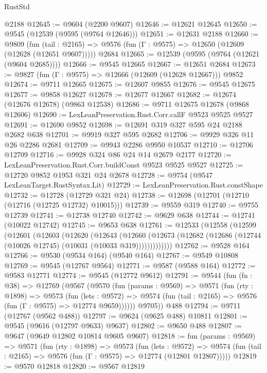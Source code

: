 \begin{lexlean}{RustStd}
\begin{coremodule}
    @2188
@12645 := @9604 (@2200 @9607)
@12646 := @12621 @12645
@12650 := @9545 (@12539 (@9595 (@9764 @12646)))
@12651 := @12631 @2188
@12660 := @9809
    (fun (tail : @2165) => @9576 (fun (Γ : @9575) => @12650 (@12609 (@12628 (@12651 @9607)))))
    @2684
@12665 := @12539 (@9595 (@9764 (@12621 (@9604 @2685))))
@12666 := @9545 @12665
@12667 := @12651 @2684
@12673 := @9827 (fun (Γ : @9575) => @12666 (@12609 (@12628 @12667))) @9852
@12674 := @9711 @12665
@12675 := @12607 @9855
@12676 := @9545 @12675
@12677 := @9858 @12627
@12678 := @12677 @12667
@12682 := @12674 (@12676 @12678) (@9863 @12538)
@12686 := @9711 @12675 @12678 (@9868 @12606)
@12690 := LexLeanPreservation.Rust.Corr.callF @9523 @9525 @9527
@12691 := @12690 @9852
@12698 := @12691 @319 @327 @595 @24 @2188 @2682 @638
@12701 := @9919 @327 @595 @2682
@12706 := @9929 @326 @11 @26 @2286 @2681
@12709 := @9943 @2286 @9950 @10537
@12710 := @12706 @12709
@12716 := @9928 @324 @86 @24 @14 @2679 @2177
@12720 := LexLeanPreservation.Rust.Corr.buildConst @9523 @9525 @9527
@12725 := @12720 @9852 @1953 @321 @24 @2678
@12728 := @9754 (@9547 LexLeanTarget.RustSyntax.Lit)
@12729 := LexLeanPreservation.Rust.constShape
@12732 := @12728 (@12729 @321 @24)
@12738 := @12698 (@12701 (@12710 (@12716 (@12725 @12732) @10015)))
@12739 := @9559 @319
@12740 := @9755 @12739
@12741 := @12738 @12740
@12742 := @9629 @638
@12744 := @12741 (@10022 @12742)
@12745 := @9653 @638
@12761 := @12533
    (@12558
      (@12599
        (@12601
          (@12603
            (@12620
              (@12643
                (@12660
                  (@12673 (@12682 (@12686 (@12744 (@10026 @12745) (@10031 (@10033 @319)))))))))))))
@12762 := @9528 @164
@12766 := @9530 (@9534 @164) (@9540 @164)
@12767 := @9549 @10808
@12769 := @9545 (@12767 @9564)
@12771 := @9587 (@9588 @164)
@12772 := @9583 @12771
@12774 := @9545 (@12772 @9612)
@12791 := @9544
    (fun (fn : @38) =>
    @12769
      (@9567
        (@9570
          (fun (params : @9569) =>
          @9571
            (fun (rty : @1898) =>
            @9573
              (fun (lets : @9572) =>
              @9574 (fun (tail : @2165) => @9576 (fun (Γ : @9575) => @12774 @9659))))))
        @9705))
    @488
@12794 := @9711 (@12767 (@9562 @488))
@12797 := @9624 (@9625 @488) @10811
@12801 := @9545 (@9616 (@12797 @9633) @9637)
@12802 := @9650 @488
@12807 := @9647 (@9649 @12802 @10814 @9605 @9607)
@12818 := fun (params : @9569) =>
  @9571
    (fun (rty : @1898) =>
    @9573
      (fun (lets : @9572) =>
      @9574 (fun (tail : @2165) => @9576 (fun (Γ : @9575) => @12774 (@12801 @12807)))))
@12819 := @9570 @12818
@12820 := @9567 @12819

\end{coremodule}
\end{lexlean}

